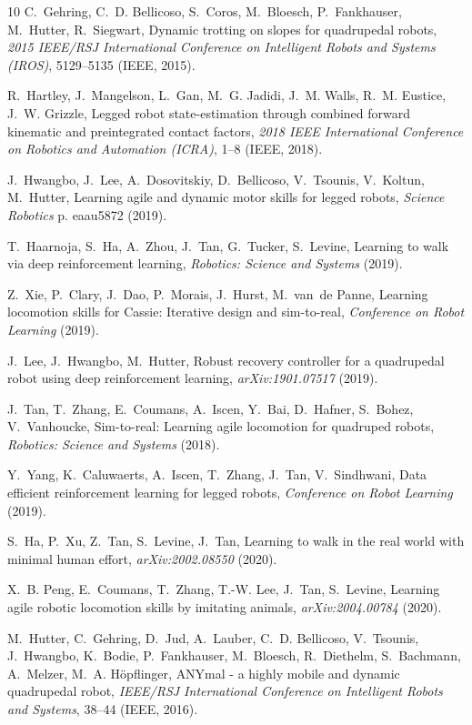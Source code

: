 \documentclass[9pt,twocolumn,twoside]{osajnl}
\begin{document}
\begin{thebibliography}{10}
C.~Gehring, C.~D. Bellicoso, S.~Coros, M.~Bloesch, P.~Fankhauser, M.~Hutter,
  R.~Siegwart, Dynamic trotting on slopes for quadrupedal robots, {\it 2015
  IEEE/RSJ International Conference on Intelligent Robots and Systems
  (IROS)\/},  5129--5135 (IEEE, 2015).

R.~Hartley, J.~Mangelson, L.~Gan, M.~G. Jadidi, J.~M. Walls, R.~M. Eustice,
  J.~W. Grizzle, Legged robot state-estimation through combined forward
  kinematic and preintegrated contact factors, {\it 2018 IEEE International
  Conference on Robotics and Automation (ICRA)\/},  1--8 (IEEE, 2018).

J.~Hwangbo, J.~Lee, A.~Dosovitskiy, D.~Bellicoso, V.~Tsounis, V.~Koltun,
  M.~Hutter, Learning agile and dynamic motor skills for legged robots, {\it
  Science Robotics\/} p. eaau5872 (2019).

T.~Haarnoja, S.~Ha, A.~Zhou, J.~Tan, G.~Tucker, S.~Levine, Learning to walk via
  deep reinforcement learning, {\it Robotics: Science and Systems\/} (2019).

Z.~Xie, P.~Clary, J.~Dao, P.~Morais, J.~Hurst, M.~van~de Panne, Learning
  locomotion skills for {Cassie}: Iterative design and sim-to-real, {\it
  Conference on Robot Learning\/} (2019).

J.~Lee, J.~Hwangbo, M.~Hutter, Robust recovery controller for a quadrupedal
  robot using deep reinforcement learning, {\it arXiv:1901.07517\/}  (2019).

J.~Tan, T.~Zhang, E.~Coumans, A.~Iscen, Y.~Bai, D.~Hafner, S.~Bohez,
  V.~Vanhoucke, Sim-to-real: Learning agile locomotion for quadruped robots,
  {\it Robotics: Science and Systems\/} (2018).

Y.~Yang, K.~Caluwaerts, A.~Iscen, T.~Zhang, J.~Tan, V.~Sindhwani, Data
  efficient reinforcement learning for legged robots, {\it Conference on Robot
  Learning\/} (2019).

S.~Ha, P.~Xu, Z.~Tan, S.~Levine, J.~Tan, Learning to walk in the real world
  with minimal human effort, {\it arXiv:2002.08550\/}  (2020).

X.~B. Peng, E.~Coumans, T.~Zhang, T.-W. Lee, J.~Tan, S.~Levine, Learning agile
  robotic locomotion skills by imitating animals, {\it arXiv:2004.00784\/}
  (2020).

M.~Hutter, C.~Gehring, D.~Jud, A.~Lauber, C.~D. Bellicoso, V.~Tsounis,
  J.~Hwangbo, K.~Bodie, P.~Fankhauser, M.~Bloesch, R.~Diethelm, S.~Bachmann,
  A.~Melzer, M.~A. H{\"{o}}pflinger, {ANYmal} - a highly mobile and dynamic
  quadrupedal robot, {\it {IEEE/RSJ} International Conference on Intelligent
  Robots and Systems\/},  38--44 ({IEEE}, 2016).


\end{thebibliography}
\end{document}
